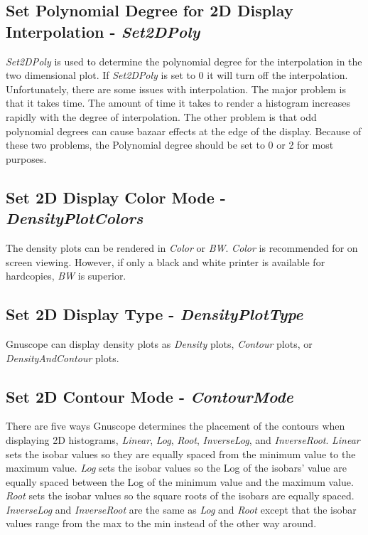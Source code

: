 \subsection{Set Polynomial Degree for 2D Display Interpolation - {\it Set2DPoly}}

{\it Set2DPoly} is used to determine the polynomial degree for the interpolation in the two dimensional plot.  If {\it Set2DPoly} is set to 0 it will turn off the interpolation.  Unfortunately, there are some issues with interpolation.  The major problem is that it takes time.  The amount of time it takes to render a histogram increases rapidly with the degree of interpolation.  The other problem is that odd polynomial degrees can cause bazaar effects at the edge of the display.  Because of these two problems, the Polynomial degree should be set to 0 or 2 for most purposes.

\subsection{Set 2D Display Color Mode - {\it DensityPlotColors}}

The density plots can be rendered in {\it Color} or {\it BW}.  {\it Color} is recommended for on screen viewing.  However, if only a black and white printer is available for hardcopies, {\it BW} is superior.

\subsection{Set 2D Display Type - {\it DensityPlotType}}

Gnuscope can display density plots as {\it Density} plots, {\it Contour} plots, or {\it DensityAndContour} plots.  

\subsection{Set 2D Contour Mode - {\it ContourMode}}

There are five ways Gnuscope determines the placement of the contours when displaying 2D histograms, {\it Linear}, {\it Log}, {\it Root}, {\it InverseLog}, and {\it InverseRoot}.  {\it Linear} sets the isobar values so they are equally spaced from the minimum value to the maximum value.  {\it Log} sets the isobar values so the Log of the isobars' value are equally spaced between the Log of the minimum value and the maximum value.  {\it Root} sets the isobar values so the square roots of the isobars are equally spaced.  {\it InverseLog} and {\it InverseRoot} are the same as {\it Log} and {\it Root} except that the isobar values range from the max to the min instead of the other way around.

